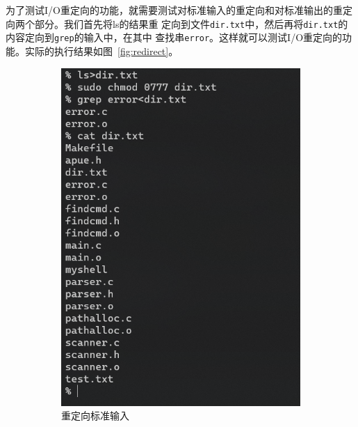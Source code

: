 \documentclass[a4paper,twoside]{article}
\begin{document}
\begin{spacing}{1.2}
为了测试I/O重定向的功能，就需要测试对标准输入的重定向和对标准输出的重定向两个部分。我们首先将ls的结果重
定向到文件\texttt{dir.txt}中，然后再将\texttt{dir.txt}的内容定向到\texttt{grep}的输入中，在其中
查找串\texttt{error}。这样就可以测试I/O重定向的功能。实际的执行结果如图~\ref{fig:redirect}。
\begin{figure}[htb]
	\centering
	\caption{I/O重定向结果}
	\label{fig:results}
	\begin{subfigure}{0.4\textwidth}
		\centering
		\includegraphics[width=\textwidth]{stdin.png}
		\caption{重定向标准输入}
		\label{fig:f2}
	\end{subfigure}
	\begin{subfigure}{0.4\textwidth}
		\centering

\end{subfigure}
\end{figure}
\end{spacing}
\end{document}
